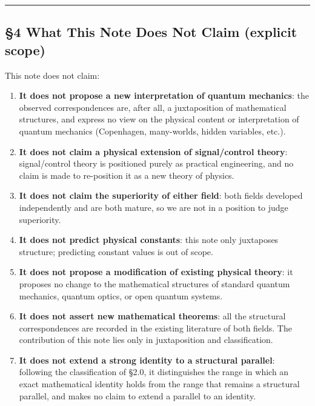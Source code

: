 \documentclass[
]{article}
\providecommand{\tightlist}{%
  \setlength{\itemsep}{0pt}\setlength{\parskip}{0pt}}
\begin{document}
\begin{center}\rule{0.5\linewidth}{0.5pt}\end{center}

\subsection{§4 What This Note Does Not Claim (explicit
scope)}\label{what-this-note-does-not-claim-explicit-scope}

This note does not claim:

\begin{enumerate}
\def\labelenumi{\arabic{enumi}.}
\tightlist
\item
  \textbf{It does not propose a new interpretation of quantum
  mechanics}: the observed correspondences are, after all, a
  juxtaposition of mathematical structures, and express no view on the
  physical content or interpretation of quantum mechanics (Copenhagen,
  many-worlds, hidden variables, etc.).
\item
  \textbf{It does not claim a physical extension of signal/control
  theory}: signal/control theory is positioned purely as practical
  engineering, and no claim is made to re-position it as a new theory of
  physics.
\item
  \textbf{It does not claim the superiority of either field}: both
  fields developed independently and are both mature, so we are not in a
  position to judge superiority.
\item
  \textbf{It does not predict physical constants}: this note only
  juxtaposes structure; predicting constant values is out of scope.
\item
  \textbf{It does not propose a modification of existing physical
  theory}: it proposes no change to the mathematical structures of
  standard quantum mechanics, quantum optics, or open quantum systems.
\item
  \textbf{It does not assert new mathematical theorems}: all the
  structural correspondences are recorded in the existing literature of
  both fields. The contribution of this note lies only in juxtaposition
  and classification.
\item
  \textbf{It does not extend a strong identity to a structural
  parallel}: following the classification of §2.0, it distinguishes the
  range in which an exact mathematical identity holds from the range
  that remains a structural parallel, and makes no claim to extend a
  parallel to an identity.
\end{enumerate}
\end{document}
